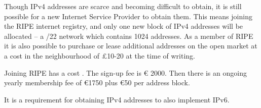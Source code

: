 Though IPv4 addresses are scarce and becoming difficult to obtain, it
is still possible for a new Internet Service Provider to obtain
them. This means joining the RIPE internet registry, and only one
new block of IPv4 addresses will be allocated -- a /22 network which
contains 1024 addresses. As a member of RIPE it is also possible to
purchase or lease additional addresses on the open market at a cost in
the neighbourhood of \pounds 10-20 at the time of writing.

Joining RIPE has a cost \cite{RIPECharges}. The sign-up fee is \euro
2000. Then there is an ongoing yearly membership fee of \euro 1750
plus \euro 50 per address block.

It is a requirement for obtaining IPv4 addresses to also implement
IPv6.
